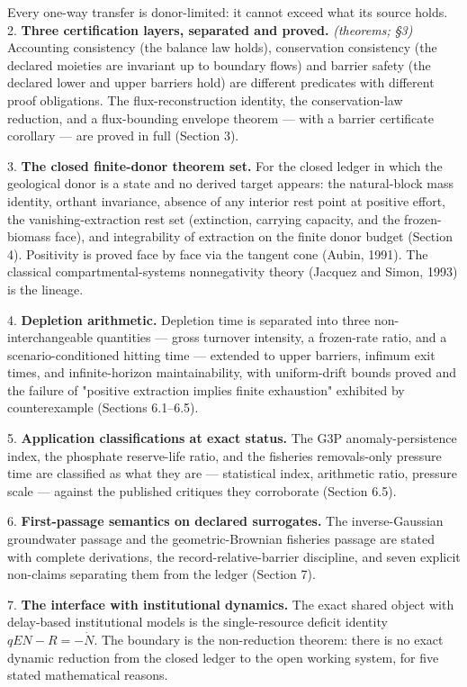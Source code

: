 \documentclass[11pt]{article}
\begin{document}
Every one-way transfer is donor-limited: it cannot exceed what its source holds. 2. \textbf{Three certification layers, separated and proved.} \emph{(theorems; \S3)} Accounting consistency (the balance law holds), conservation consistency (the declared moieties are invariant up to boundary flows) and barrier safety (the declared lower and upper barriers hold) are different predicates with different proof obligations. The flux-reconstruction identity, the conservation-law reduction, and a flux-bounding envelope theorem --- with a barrier certificate corollary --- are proved in full (Section 3).

3. \textbf{The closed finite-donor theorem set.} For the closed ledger in which the geological donor is a state and no derived target appears: the natural-block mass identity, orthant invariance, absence of any interior rest point at positive effort, the vanishing-extraction rest set (extinction, carrying capacity, and the frozen-biomass face), and integrability of extraction on the finite donor budget (Section 4). Positivity is proved face by face via the tangent cone (Aubin, 1991). The classical compartmental-systems nonnegativity theory (Jacquez and Simon, 1993) is the lineage.

4. \textbf{Depletion arithmetic.} Depletion time is separated into three non-interchangeable quantities --- gross turnover intensity, a frozen-rate ratio, and a scenario-conditioned hitting time --- extended to upper barriers, infimum exit times, and infinite-horizon maintainability, with uniform-drift bounds proved and the failure of "positive extraction implies finite exhaustion" exhibited by counterexample (Sections 6.1--6.5).

5. \textbf{Application classifications at exact status.} The G3P anomaly-persistence index, the phosphate reserve-life ratio, and the fisheries removals-only pressure time are classified as what they are --- statistical index, arithmetic ratio, pressure scale --- against the published critiques they corroborate (Section 6.5).

6. \textbf{First-passage semantics on declared surrogates.} The inverse-Gaussian groundwater passage and the geometric-Brownian fisheries passage are stated with complete derivations, the record-relative-barrier discipline, and seven explicit non-claims separating them from the ledger (Section 7).

7. \textbf{The interface with institutional dynamics.} The exact shared object with delay-based institutional models is the single-resource deficit identity \(qEN - R = -\dot N\). The boundary is the non-reduction theorem: there is no exact dynamic reduction from the closed ledger to the open working system, for five stated mathematical reasons.
\end{document}
